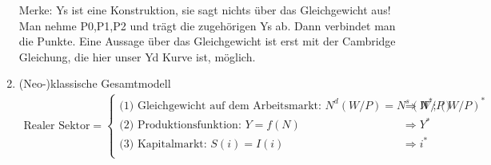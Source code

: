 \documentclass{scrartcl}
\begin{document}
\begin{enumerate}
    Merke: Ys ist eine Konstruktion, sie sagt nichts \"{u}ber das Gleichgewicht aus! Man nehme P0,P1,P2 und tr\"{a}gt die zugeh\"{o}rigen Ys ab. Dann verbindet man die Punkte. Eine Aussage \"{u}ber das Gleichgewicht ist erst mit der Cambridge Gleichung, die hier unser Yd Kurve ist, m\"{o}glich.
\item (Neo-)klassische Gesamtmodell
\begin{align*}
\text{Realer Sektor} = \begin{cases}
\text{(1) Gleichgewicht auf dem Arbeitsmarkt: } N^d(W/P) = N^s(W/P) &\Rightarrow N^*;(W/P)^*\\
\text{(2) Produktionsfunktion: } Y=f(N) & \Rightarrow Y^*\\
\text{(3) Kapitalmarkt: } S(i)=I(i) & \Rightarrow i^*\\
\end{cases}
\end{align*}


\end{enumerate}
\end{document}
